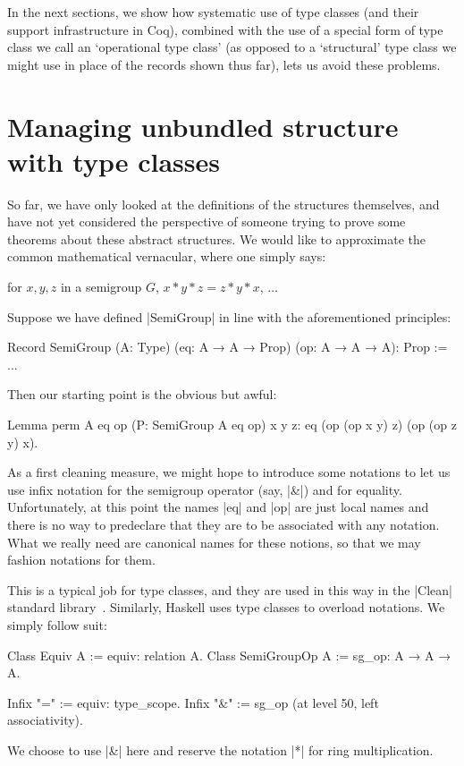 \documentclass[a4paper,10pt,runningheads]{llncs}
\begin{document}
In the next sections, we show how systematic use of type classes (and their support infrastructure
in Coq), combined with the use of a special form of type class we call an `operational type class'
(as opposed to a `structural' type class we might use in place of the records shown thus far), lets
us avoid these problems.

\section{Managing unbundled structure with type classes}

So far, we have only looked at the definitions of the structures themselves, and have not yet
considered the perspective of someone trying to prove some theorems about these abstract structures.
We would like to approximate the common mathematical vernacular, where one
simply says:

for $x, y, z$ in a semigroup $G$, $x * y * z = z * y * x$, $\ldots$

Suppose we have defined |SemiGroup| in line with the aforementioned principles:
\begin{code}
Record SemiGroup (A: Type) (eq: A → A → Prop)
 (op: A → A → A): Prop := ...
\end{code}
Then our starting point is the obvious but awful:
\begin{code}
Lemma perm A eq op (P: SemiGroup A eq op) x y z:
                   eq (op (op x y) z) (op (op z y) x).
\end{code}
As a first cleaning measure, we might hope to introduce some notations to let us use infix notation
for the semigroup operator (say, |&|) and for equality. Unfortunately, at this point the names |eq|
and |op| are just local names and there is no way to predeclare that they are to be associated with
any notation. What we really need are canonical names for these notions, so that we may fashion
notations for them.

This is a typical job for type classes, and they are used in this way in the |Clean| standard
library~\cite{Clean}. Similarly, Haskell uses type classes to overload notations.
We simply follow suit:
\begin{code}
  Class Equiv A := equiv: relation A.
  Class SemiGroupOp A := sg_op: A → A → A.

  Infix "=" := equiv: type_scope.
  Infix "&" := sg_op (at level 50, left associativity).
\end{code}
We choose to use |&| here and reserve the notation |*| for ring multiplication.
\end{document}
